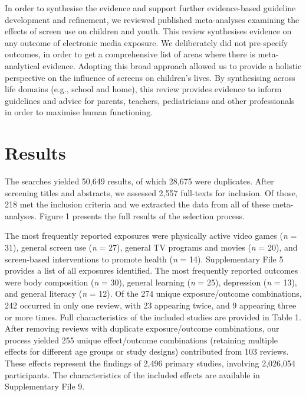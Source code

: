 \documentclass[
  english,
  man]{apa6}
\begin{document}
In order to synthesise the evidence and support further evidence-based guideline development and refinement, we reviewed published meta-analyses examining the effects of screen use on children and youth.
This review synthesises evidence on any outcome of electronic media exposure.
We deliberately did not pre-specify outcomes, in order to get a comprehensive list of areas where there is meta-analytical evidence.
Adopting this broad approach allowed us to provide a holistic perspective on the influence of screens on children's lives.
By synthesising across life domains (e.g., school and home), this review provides evidence to inform guidelines and advice for parents, teachers, pediatricians and other professionals in order to maximise human functioning.

\newpage

\hypertarget{results}{%
\section{Results}\label{results}}

The searches yielded 50,649 results, of which 28,675 were duplicates.
After screening titles and abstracts, we assessed 2,557 full-texts for inclusion.
Of those, 218 met the inclusion criteria and we extracted the data from all of these meta-analyses.
Figure 1 presents the full results of the selection process.

The most frequently reported exposures were physically active video games (\emph{n} = 31), general screen use (\emph{n} = 27), general TV programs and movies (\emph{n} = 20), and screen-based interventions to promote health (\emph{n} = 14).
Supplementary File 5 provides a list of all exposures identified.
The most frequently reported outcomes were body composition (\emph{n} = 30), general learning (\emph{n} = 25), depression (\emph{n} = 13), and general literacy (\emph{n} = 12).
Of the 274 unique exposure/outcome combinations, 242 occurred in only one review, with 23 appearing twice, and 9 appearing three or more times.
Full characteristics of the included studies are provided in Table 1.
After removing reviews with duplicate exposure/outcome combinations, our process yielded 255 unique effect/outcome combinations (retaining multiple effects for different age groups or study designs) contributed from 103 reviews.
These effects represent the findings of 2,496 primary studies, involving 2,026,054 participants.
The characteristics of the included effects are available in Supplementary File 9.
\end{document}
